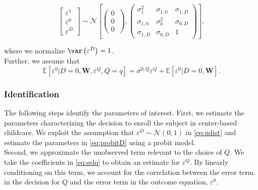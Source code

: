 \begin{equation}
        \left[ \begin{array}{l}
        	 \varepsilon^1 \\
            \varepsilon^0 \\
            \varepsilon^D
        \end{array} \right]  \sim \mathcal{N} \left[ \left( \begin{array}{l}
        	 0 \\
           0 \\
           0
        \end{array} \ \right),
                \left( \begin{array}{llll}
        	 \sigma_{1}^2 & \sigma_{1,0} & \sigma_{1,D}   \\
             \sigma_{1,0} & \sigma_{0}^2 & \sigma_{0,D}   \\
             \sigma_{1,D} & \sigma_{0,D} & 1
        \end{array} \right) \right],  \label{eq:udist}
\end{equation}

\noindent where we normalize $\var \left( \varepsilon^D \right) =1$.\\

\noindent Further, we assume that
\begin{equation}
\mathbb{E}\left[\varepsilon^0|D=0,\mathbf{W},\varepsilon^{Q},Q=q\right]=\sigma^{0,Q}\varepsilon^{Q}+\mathbb{E}\left[\varepsilon^0|D=0,\mathbf{W}\right].
\label{eq:E[epsilon0]}
\end{equation}

\subsubsection{Identification}

\noindent The following steps identify the parameters of interest. First, we estimate the parameters characterizing the decision to enroll the subject in center-based childcare. We exploit the assumption that $\varepsilon^D \sim \mathcal{N} \left( 0, 1 \right)$ in \eqref{eq:udist} and estimate the parameters in \eqref{eq:probitD} using a probit model.\\

\noindent Second, we approximate the unobserved term relevant to the choice of $Q$. We take the coefficients in \eqref{eq:selq} to obtain an estimate for $\varepsilon^{Q}$. By linearly conditioning on this term, we account for the correlation between the error term in the decision for $Q$ and the error term in the outcome equation, $\varepsilon^0$.\\

